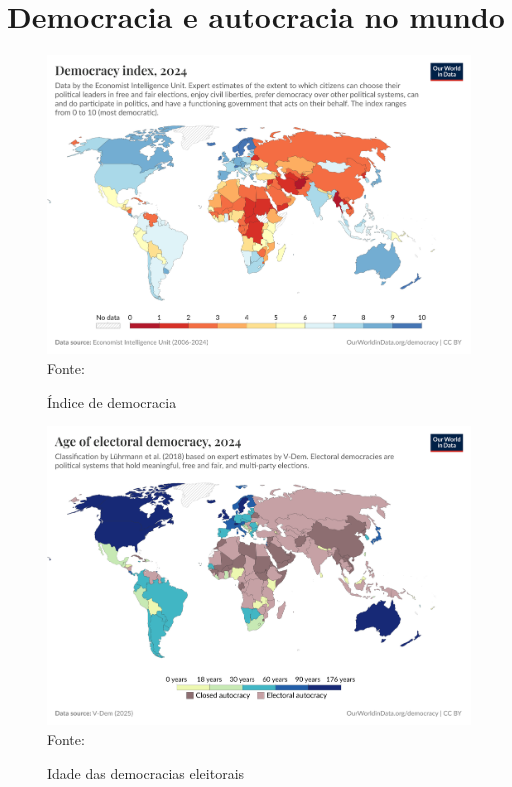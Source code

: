 \section{Democracia e autocracia no mundo}

\begin{figure}[ht]
    \centering
    \caption{Índice de democracia}
    \includegraphics[width=1\linewidth]{figuras/democracia/democracy-index-eiu.png}
    \label{fig:democracy-index-eiu}
    \footnotesize{Fonte: \cite{electoral_democracy_eiu}}
\end{figure}

\begin{figure}[ht]
    \centering
    \caption{Idade das democracias eleitorais}
    \includegraphics[width=1\linewidth]{figuras/democracia/age-of-electoral-democracy.png}
    \label{fig:age-of-electoral-democracy}
    \footnotesize{Fonte: \cite{age_electoral_democracy}}
\end{figure}


